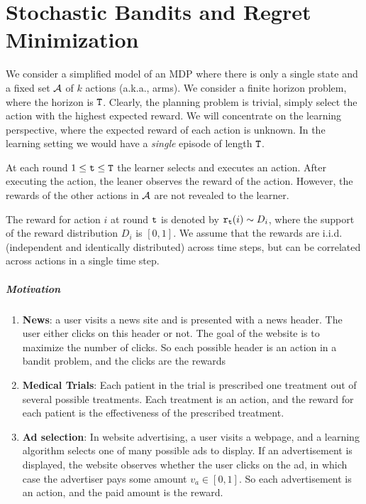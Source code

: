 

\chapter{Stochastic Bandits and Regret Minimization}
\label{chapter-MAB}

We consider a simplified model of an MDP where there is only a
single state and a fixed set $\mathcal{A}$ of $k$ actions (a.k.a., arms). We consider a finite horizon problem, where the horizon is ${\tt T}$.
Clearly, the planning problem is trivial, simply select the action
with the highest expected reward. We will concentrate on the
learning perspective, where the expected reward of each action is
unknown. In the learning setting we would have a \emph{single} episode of length ${\tt T}$.

At each round $1\leq {\tt t}\leq {\tt T}$ the learner selects and executes an action. After executing the action, the leaner observes the reward of the action. However, the rewards of the other actions in $\mathcal{A}$ are not revealed to the learner.

The reward for action $i$ at round ${\tt t}$ is denoted by ${\tt r}_{{\tt t}}(i)\sim D_{i}$, where the support of the reward distribution $D_{i}$ is $[0,1]$. We assume that the rewards are i.i.d. (independent and identically distributed) across time steps, but can be correlated across actions in a single time step.

\paragraph{Motivation}
\begin{enumerate}
\item \textbf{News}: a user visits a news site and is presented with a news header. The user either clicks on this header or not. The goal of
the website is to maximize the number of clicks. So each possible
header is an action in a bandit problem, and the clicks are the
rewards
\item \textbf{Medical Trials}: Each patient in the trial is prescribed one treatment out of several possible treatments. Each treatment is an
action, and the reward for each patient is the effectiveness of the
prescribed treatment.
\item \textbf{Ad selection}: In website advertising, a user visits a webpage, and a learning algorithm selects one of many possible ads to
display. If an advertisement is displayed, the website observes
whether the user clicks on the ad, in which case the advertiser pays
some amount $v_{a} \in[0, 1]$. So each advertisement is an action,
and the paid amount is the reward.
\end{enumerate}

